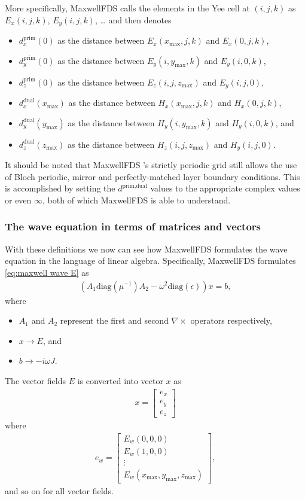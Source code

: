\documentclass{article}
\newcommand{\E}[2]{\begin{align}#2\label{eq:#1}\end{align}}
\newcommand{\curl}{\nabla\times}
\newcommand{\eq}[1]{\eqref{eq:#1}}
\newcommand{\MaxwellFDS}{MaxwellFDS }
\newcommand{\BI}{\begin{itemize}\item}
\newcommand{\EI}{\end{itemize}}
\newcommand{\I}{\item}
\newcommand{\prim}{\text{prim}}
\newcommand{\dual}{\text{dual}}
\newcommand{\mx}{\text{max}}
\newcommand{\diag}{\text{diag}}
\begin{document}
More specifically, \MaxwellFDS calls the elements 
    in the Yee cell at $(i,j,k)$ as $E_x(i,j,k)$, $E_y(i,j,k)$, \ldots 
    and then denotes 
\BI $d^\prim_x(0)$ as the distance 
    between $E_x(x_\mx,j,k)$ and $E_x(0,j,k)$,
\I  $d^\prim_y(0)$ as the distance 
    between $E_y(i,y_\mx,k)$ and $E_y(i,0,k)$,
\I  $d^\prim_z(0)$ as the distance 
    between $E_z(i,j,z_\mx)$ and $E_y(i,j,0)$,
\I  $d^\dual_x(x_\mx)$ as the distance 
    between $H_x(x_\mx,j,k)$ and $H_x(0,j,k)$,
\I  $d^\dual_y(y_\mx)$ as the distance 
    between $H_y(i,y_\mx,k)$ and $H_y(i,0,k)$, and
\I  $d^\dual_z(z_\mx)$ as the distance 
    between $H_z(i,j,z_\mx)$ and $H_y(i,j,0)$. \EI

It should be noted that \MaxwellFDS's strictly periodic grid still
    allows the use of Bloch periodic, mirror and perfectly-matched layer
    boundary conditions.
This is accomplished by setting the $d^{\prim,\dual}$ values to 
    the appropriate complex values or even $\infty$,
    both of which \MaxwellFDS is able to understand.
    
\subsubsection{The wave equation in terms of matrices and vectors}
With these definitions we now can see how \MaxwellFDS
    formulates the wave equation in the language of linear algebra.
Specifically, \MaxwellFDS formulates \eq{maxwell wave E} as
\E  {maxwell wave E discretized}
    {(A_1 \diag(\mu^{-1}) A_2 - \omega^2 \diag(\epsilon)) x = b,}
    where
    \BI $A_1$ and $A_2$ represent the first and second $\curl$ operators
        respectively,
    \I  $x \to E$, and
    \I  $b \to -i \omega J$. \EI

The vector fields $E$ is converted into vector $x$ as
\E{}{x = \begin{bmatrix} e_x \\ e_y \\ e_z \end{bmatrix}}
    where
\E{}{e_w = \begin{bmatrix} E_w(0,0,0) \\ E_w(1,0,0) \\
                        \vdots \\ E_w(x_\mx, y_\mx, z_\mx) \end{bmatrix},}
and so on for all vector fields.
\end{document}
